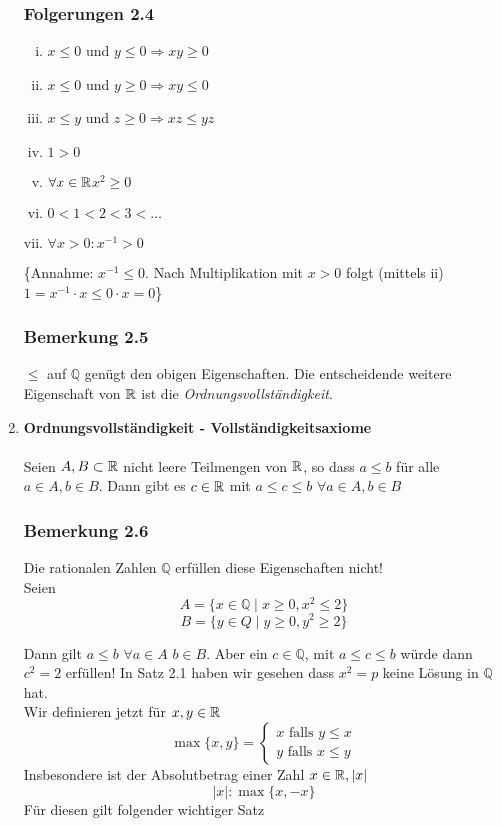 \begin{enumerate}
\subsubsection*{Folgerungen 2.4}
\begin{enumerate}[i)]
\item $x\leq 0$ und $y\leq 0 \Rightarrow xy\geq 0$
\item $x\leq 0$ und $y\geq 0\Rightarrow xy\leq 0$
\item $x\leq y$ und $z\geq 0\Rightarrow xz\leq yz$
\item $1>0$
\item $\forall x\in\mathbb{R}$\hspace{10mm}$x^2\geq 0$
\item $0<1<2<3<\dots$
\item $\forall x>0: x^{-1}>0$
\end{enumerate}
\{Annahme: $x^{-1}\leq 0$. Nach Multiplikation mit $x>0$ folgt (mittels ii) $1=x^{-1}\cdot x\leq 0\cdot x=0$\}
\subsubsection*{Bemerkung 2.5}
$\leq$ auf $\mathbb{Q}$ genügt den obigen Eigenschaften. Die entscheidende weitere Eigenschaft von $\mathbb{R}$ ist die \textit{Ordnungsvollständigkeit}.

\newpage
\item \textbf{Ordnungsvollständigkeit - Vollständigkeitsaxiome}
\\
\\
Seien $A,B\subset\mathbb{R}$ nicht leere Teilmengen von $\mathbb{R}$, so dass $a\leq b$ für alle $a\in A,b\in B$. Dann gibt es $c\in\mathbb{R}$ mit $a\leq c\leq b$\hspace{5mm} $\forall a\in A,b\in B$
\subsubsection*{Bemerkung 2.6}
Die rationalen Zahlen $\mathbb{Q}$ erfüllen diese Eigenschaften nicht!\\


Seien \[A=\{x\in\mathbb{Q}\mid x\geq 0, x^2\leq 2\}\] \[B=\{y\in Q\mid y\geq 0, y^2 \geq 2\}\]

Dann gilt $a\leq b$ $\forall a\in A$ $b\in B$. Aber ein $c\in\mathbb{Q}$, mit $a\leq c\leq b$ würde dann $c^2=2$ erfüllen! In Satz 2.1 haben wir gesehen dass $x^2=p$ keine Lösung in $\mathbb{Q}$ hat. \\

Wir definieren jetzt für $x,y\in\mathbb{R}$ \[\max \{ x,y\}  = \left\{ {\begin{array}{*{20}{c}}
{x\text{ falls }y \le x}\\
{y\text{ falls }x \le y}
\end{array}} \right.\] Insbesondere ist der Absolutbetrag einer Zahl $x\in\mathbb{R}, \left| x \right|$ \[\left| x \right|:\max \{x,-x\}\] Für diesen gilt folgender wichtiger Satz

\end{enumerate}
